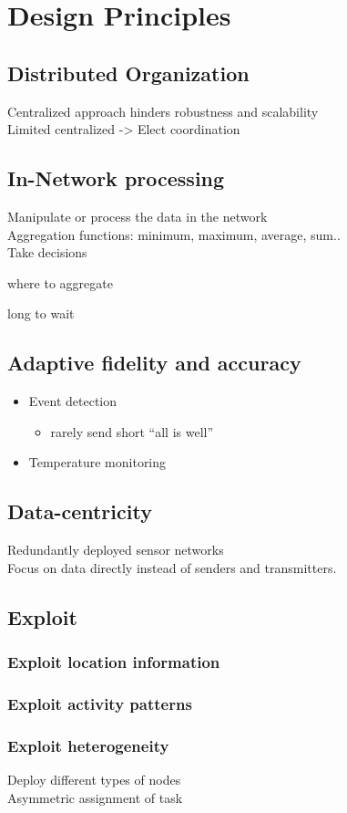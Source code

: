 \section{Design Principles}

\subsection{Distributed Organization}
Centralized approach hinders robustness and scalability
\\
Limited centralized -> Elect coordination
\subsection{In-Network processing}
Manipulate or process the data in the network
\\
Aggregation functions: minimum, maximum, average, sum..
\\
Take decisions
\begin{description}
	\item where to aggregate
	\item long to wait
\end{description}

\subsection{Adaptive fidelity and accuracy}

\begin{itemize}
	\item Event detection
		\begin{itemize}
			\item rarely send short ``all is well''
		\end{itemize}
	\item Temperature monitoring
\end{itemize}

\subsection{Data-centricity}
Redundantly deployed sensor networks
\\
Focus on data directly instead of senders and transmitters.

\subsection{Exploit}
\subsubsection{Exploit location information}
\subsubsection{Exploit activity patterns}
\subsubsection{Exploit heterogeneity}

Deploy different types of nodes
\\
Asymmetric assignment of task
